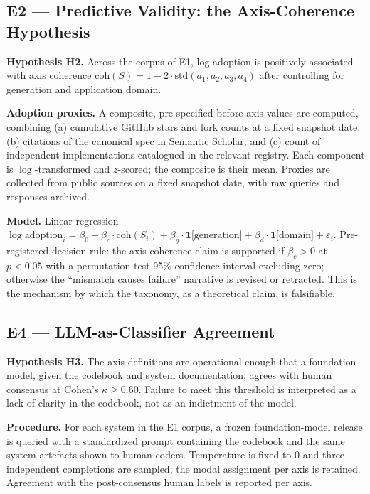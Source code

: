 \documentclass{IEEEcsmag}
\begin{document}
\subsection{E2 --- Predictive Validity: the Axis-Coherence Hypothesis}

\textbf{Hypothesis H2.}  Across the corpus of E1, log-adoption is positively associated with axis coherence $\mathrm{coh}(S) = 1 - 2\cdot\mathrm{std}(a_1, a_2, a_3, a_4)$ after controlling for generation and application domain.

\textbf{Adoption proxies.}  A composite, pre-specified before axis values are computed, combining (a) cumulative GitHub stars and fork counts at a fixed snapshot date, (b) citations of the canonical spec in Semantic Scholar, and (c) count of independent implementations catalogued in the relevant registry.  Each component is $\log$-transformed and $z$-scored; the composite is their mean.  Proxies are collected from public sources on a fixed snapshot date, with raw queries and responses archived.

\textbf{Model.}  Linear regression $\log\text{adoption}_i = \beta_0 + \beta_c \cdot \mathrm{coh}(S_i) + \beta_g \cdot \mathbf{1}\text{[generation]} + \beta_d \cdot \mathbf{1}\text{[domain]} + \varepsilon_i$.  Pre-registered decision rule: the axis-coherence claim is supported if $\beta_c > 0$ at $p < 0.05$ with a permutation-test 95\% confidence interval excluding zero; otherwise the ``mismatch causes failure'' narrative is revised or retracted.  This is the mechanism by which the taxonomy, as a theoretical claim, is falsifiable.

\subsection{E4 --- LLM-as-Classifier Agreement}

\textbf{Hypothesis H3.}  The axis definitions are operational enough that a foundation model, given the codebook and system documentation, agrees with human consensus at Cohen's $\kappa \geq 0.60$.  Failure to meet this threshold is interpreted as a lack of clarity in the codebook, not as an indictment of the model.

\textbf{Procedure.}  For each system in the E1 corpus, a frozen foundation-model release is queried with a standardized prompt containing the codebook and the same system artefacts shown to human coders.  Temperature is fixed to $0$ and three independent completions are sampled; the modal assignment per axis is retained.  Agreement with the post-consensus human labels is reported per axis.
\end{document}
